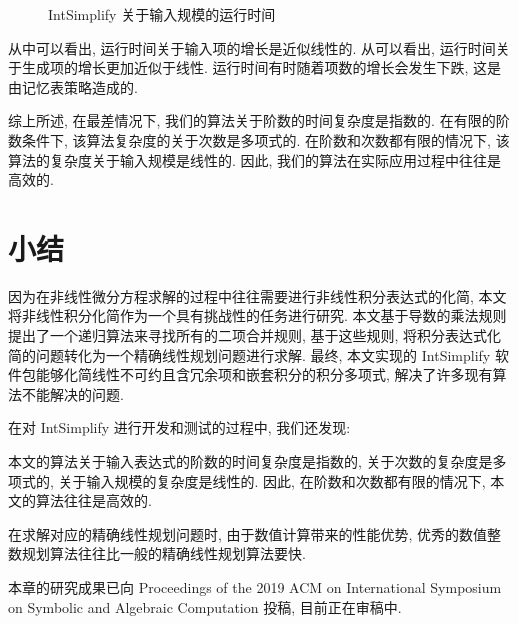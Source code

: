 \begin{figure}[htb]
\centering
{}
\caption{IntSimplify 关于输入规模的运行时间}
\label{items_all}
\end{figure}

从中可以看出, 运行时间关于输入项的增长是近似线性的. 从可以看出, 运行时间关于生成项的增长更加近似于线性. 运行时间有时随着项数的增长会发生下跌, 这是由记忆表策略造成的. 

综上所述, 在最差情况下, 我们的算法关于阶数的时间复杂度是指数的. 在有限的阶数条件下, 该算法复杂度的关于次数是多项式的. 在阶数和次数都有限的情况下, 该算法的复杂度关于输入规模是线性的. 因此, 我们的算法在实际应用过程中往往是高效的.  

\section{小结} \label{Conclusion-03} 
因为在非线性微分方程求解的过程中往往需要进行非线性积分表达式的化简, 本文将非线性积分化简作为一个具有挑战性的任务进行研究. 本文基于导数的乘法规则提出了一个递归算法来寻找所有的二项合并规则, 基于这些规则, 将积分表达式化简的问题转化为一个精确线性规划问题进行求解. 最终, 本文实现的 IntSimplify 软件包能够化简线性不可约且含冗余项和嵌套积分的积分多项式, 解决了许多现有算法不能解决的问题.  

在对 IntSimplify 进行开发和测试的过程中, 我们还发现:
\begin{compactenum}[(1)]
\item 本文的算法关于输入表达式的阶数的时间复杂度是指数的, 关于次数的复杂度是多项式的, 关于输入规模的复杂度是线性的. 因此, 在阶数和次数都有限的情况下, 本文的算法往往是高效的.
\item 在求解对应的精确线性规划问题时, 由于数值计算带来的性能优势, 优秀的数值整数规划算法往往比一般的精确线性规划算法要快. 
\end{compactenum}

本章的研究成果已向  Proceedings of the 2019 ACM on International Symposium on Symbolic and Algebraic Computation 投稿, 目前正在审稿中.
